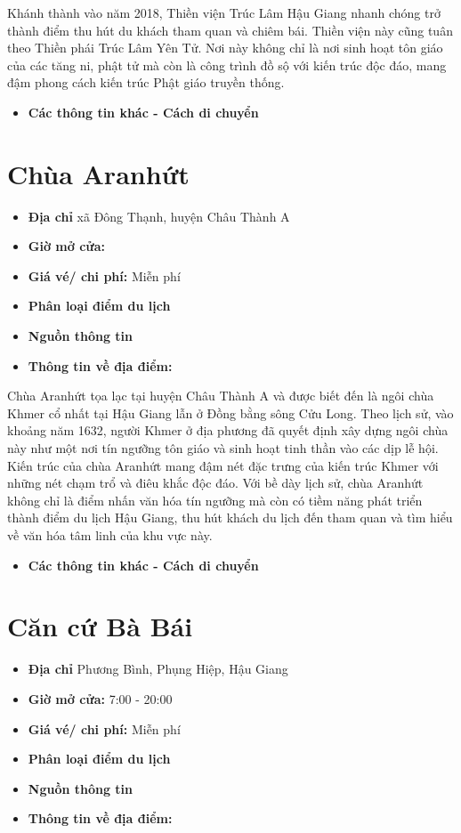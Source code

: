 \documentclass{article}
\begin{document}
Khánh thành vào năm 2018, Thiền viện Trúc Lâm Hậu Giang nhanh chóng trở thành điểm thu hút du khách tham quan và chiêm bái. Thiền viện này cũng tuân theo Thiền phái Trúc Lâm Yên Tử. Nơi này không chỉ là nơi sinh hoạt tôn giáo của các tăng ni, phật tử mà còn là công trình đồ sộ với kiến trúc độc đáo, mang đậm phong cách kiến trúc Phật giáo truyền thống.

\begin{itemize}
    \item{\textbf{Các thông tin khác - Cách di chuyển}}
\end{itemize}

\section{Chùa Aranhứt}
\begin{itemize}
    \item{\textbf{Địa chỉ}} xã Đông Thạnh, huyện Châu Thành A
    \item{\textbf{Giờ mở cửa:}}
    \item{\textbf{Giá vé/ chi phí:}} Miễn phí
    \item{\textbf{Phân loại điểm du lịch} }
    \item{\textbf{Nguồn thông tin}}
    \item{\textbf{Thông tin về địa điểm:}}
\end{itemize}

Chùa Aranhứt tọa lạc tại huyện Châu Thành A và được biết đến là ngôi chùa Khmer cổ nhất tại Hậu Giang lẫn ở Đồng bằng sông Cửu Long. Theo lịch sử, vào khoảng năm 1632, người Khmer ở địa phương đã quyết định xây dựng ngôi chùa này như một nơi tín ngưỡng tôn giáo và sinh hoạt tinh thần vào các dịp lễ hội. Kiến trúc của chùa Aranhứt mang đậm nét đặc trưng của kiến trúc Khmer với những nét chạm trổ và điêu khắc độc đáo. Với bề dày lịch sử, chùa Aranhứt không chỉ là điểm nhấn văn hóa tín ngưỡng mà còn có tiềm năng phát triển thành điểm du lịch Hậu Giang, thu hút khách du lịch đến tham quan và tìm hiểu về văn hóa tâm linh của khu vực này.

\begin{itemize}
    \item{\textbf{Các thông tin khác - Cách di chuyển}}
\end{itemize}

\section{Căn cứ Bà Bái}
\begin{itemize}
    \item{\textbf{Địa chỉ}} Phương Bình, Phụng Hiệp, Hậu Giang
    \item{\textbf{Giờ mở cửa:}} 7:00 - 20:00
    \item{\textbf{Giá vé/ chi phí:}} Miễn phí
    \item{\textbf{Phân loại điểm du lịch} }
    \item{\textbf{Nguồn thông tin}}
    \item{\textbf{Thông tin về địa điểm:}}
\end{itemize}
\end{document}
